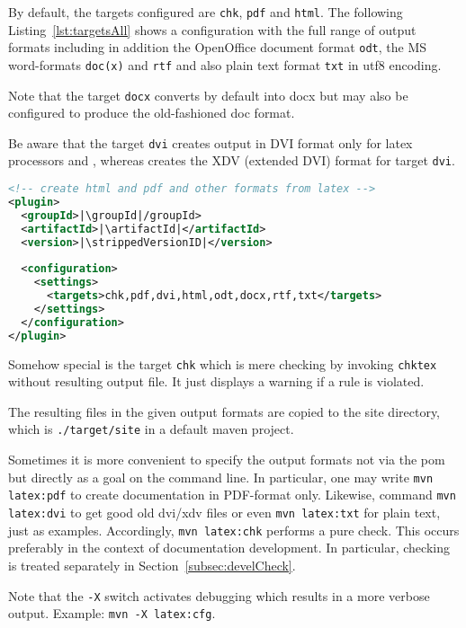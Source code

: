 By default, the targets configured are \texttt{chk}, \texttt{pdf} and \texttt{html}. 
The following Listing~\ref{lst:targetsAll} shows a configuration 
with the full range of output formats including in addition 
the OpenOffice document format \texttt{odt}, 
the MS word-formats \texttt{doc(x)} and \texttt{rtf} %
and also plain text format \texttt{txt} in utf8 encoding. 

Note that the target \texttt{docx} converts by default into \gls{docx} 
but may also be configured to produce the old-fashioned \gls{doc} format. 

Be aware that the target \texttt{dvi} creates output in DVI format 
only for latex processors \lualatex{} and \pdflatex{}, 
whereas \xelatex{} creates the XDV (extended DVI) format for target \texttt{dvi}. 

\begin{lstlisting}[language=xml, basicstyle=\small,
escapechar=|,
float, captionpos=b, label={lst:targetsAll}, 
caption={Configuration with full range output formats}]
<!-- create html and pdf and other formats from latex -->
<plugin>
  <groupId>|\groupId|/groupId>
  <artifactId>|\artifactId|</artifactId>
  <version>|\strippedVersionID|</version>
	
  <configuration>
    <settings>
      <targets>chk,pdf,dvi,html,odt,docx,rtf,txt</targets>
    </settings>
  </configuration>
</plugin>
\end{lstlisting}

Somehow special is the target \texttt{chk} 
which is mere checking by invoking \texttt{chktex} 
without resulting output file. 
It just displays a warning if a rule is violated. 

The resulting files in the given output formats 
are copied to the site directory, 
which is \texttt{./target/site} in a default maven project. 

Sometimes it is more convenient 
to specify the output formats not via the pom 
but directly as a goal on the command line. 
In particular, one may write \texttt{mvn latex:pdf} to create documentation 
in PDF-format only.
Likewise, command \texttt{mvn latex:dvi} to get good old dvi/xdv files
or even \texttt{mvn latex:txt} for plain text, just as examples. 
Accordingly, \texttt{mvn latex:chk} performs a pure check. 
This occurs preferably in the context of documentation development. 
In particular, checking is treated separately in Section~\ref{subsec:develCheck}. 

Note that the \texttt{-X} switch activates debugging 
which results in a more verbose output. 
Example: \texttt{mvn -X latex:cfg}. 

